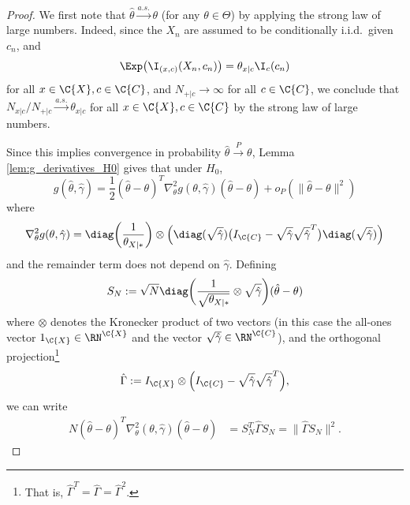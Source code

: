\begin{proof}
  We first note that $\hat\theta \stackrel{a.s.}{\to} \theta$ (for any $\theta \in \Theta$) by applying the strong law of large numbers.
  Indeed, since the $X_n$ are assumed to be conditionally i.i.d.\ given $c_n$, and 
    $$\Exp \big(\I_{(x,c)}(X_n,c_n)\big) = \theta_{x|c} \I_c(c_n)$$
  for all $x \in \C{X}, c \in \C{C}$, and $N_{+|c} \to \infty$ for all
  $c \in \C{C}$, we conclude that $N_{x|c} / N_{+|c} \stackrel{a.s.}{\to} \theta_{x|c}$ 
  for all $x \in \C{X}, c \in \C{C}$
  by the strong law of large numbers.

  Since this implies convergence in probability $\hat\theta \stackrel{P}{\to} \theta$,
  Lemma \ref{lem:g_derivatives_H0} gives that under $H_0$,
  $$g(\hat\theta, \hat\gamma) = \frac{1}{2} (\hat\theta - \theta)^T \nabla_\theta^2 g(\theta,\hat\gamma) (\hat\theta - \theta) + o_P(\lVert\hat\theta - \theta\rVert^2)$$
  where
  $$\nabla^2_{\theta} g(\theta,\hat\gamma) = \diag\bigg(\frac{1}{\theta_{X|\ast}}\bigg) \otimes \left(\diag(\sqrt{\hat\gamma}) \big(I_{\C{C}} - \sqrt{\hat\gamma} \sqrt{\hat\gamma}^T\big)\diag(\sqrt{\hat\gamma})\right)$$
  and the remainder term does not depend on $\hat\gamma$.
  Defining
  $$S_N := \sqrt{N} \diag\bigg(\frac{1}{\sqrt{\theta_{X|\ast}}} \otimes \sqrt{\hat\gamma}\bigg) (\hat\theta - \theta)$$
  where $\otimes$ denotes the Kronecker product of two vectors (in this case the all-ones vector $1_{\C{X}} \in \RN^{\C{X}}$ and the vector $\sqrt{\hat\gamma} \in \RN^{\C{C}}$),
  and the orthogonal projection\footnote{That is, $\hat\Gamma^T = \hat\Gamma = \hat\Gamma^2$.}
  $$\hat\Gamma := I_{\C{X}} \otimes \Big(I_{\C{C}} - \sqrt{\hat\gamma} \sqrt{\hat\gamma}^T\Big),$$
  we can write
  \begin{equation*}\begin{split}
     N (\hat\theta - \theta)^T \nabla_\theta^2(\theta,\hat\gamma) (\hat\theta - \theta) 
    & = S_N^T \hat \Gamma S_N 
    = \lVert \hat\Gamma S_N \rVert^2.
  \end{split}\end{equation*}


\end{proof}
